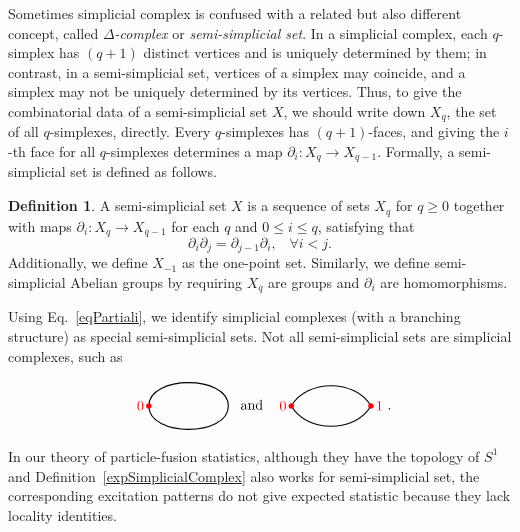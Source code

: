 \documentclass[reprint, amsmath, amssymb, showpacs, floatfix, longbibliography, aps, twocolumn, superscriptaddress, nofootinbib]{revtex4-2}
\theoremstyle{definition}
\newtheorem{definition}{Definition}[section]
\begin{document}
Sometimes simplicial complex is confused with a related but also different concept, called \emph{$\Delta$-complex} or \textit{semi-simplicial set}. In a simplicial complex, each $q$-simplex has $(q+1)$ distinct vertices and is uniquely determined by them; in contrast, in a semi-simplicial set, vertices of a simplex may coincide, and a simplex may not be uniquely determined by its vertices. Thus, to give the combinatorial data of a semi-simplicial set $X$, we should write down $X_q$, the set of all $q$-simplexes, directly. Every $q$-simplexes has $(q+1)$-faces, and giving the $i$-th face for all $q$-simplexes determines a map $\partial_i:X_q\rightarrow X_{q-1}$. Formally, a semi-simplicial set is defined as follows.
\begin{definition}\label{defSemiSimplicial}
	A semi-simplicial set $X$ is a sequence of sets $X_q$ for $q\ge 0$ together with maps $\partial_i: X_q\rightarrow X_{q-1}$ for each $q$ and $0\le i\le q$, satisfying that
	\begin{equation}
		\partial_i\partial_j=\partial_{j-1}\partial_i,\;\;\;\forall i<j.
	\end{equation}
	Additionally, we define $X_{-1}$ as the one-point set. Similarly, we define  semi-simplicial Abelian groups by requiring $X_q$ are groups and $\partial_i$ are homomorphisms.
\end{definition}

Using Eq.~\ref{eqPartiali}, we identify simplicial complexes (with a branching structure) as special semi-simplicial sets. Not all semi-simplicial sets are simplicial complexes, such as
\begin{equation}
	\vcenter{\hbox{\raisebox{-2.5ex}{
				\begin{tikzpicture}
					\coordinate (A) at (0,0);  
					\coordinate (C) at (2,0);   
					\draw[thick] (A) to[out=90, in=90] (C);   
					\draw[thick] (A) to[out=-90, in=-90] (C); 
					\fill[red] (A) circle (2pt) node[left] {0};
	\end{tikzpicture}}}} \;\;\; \text{and}
	\;\;\;
	\vcenter{\hbox{\raisebox{-2ex}{\begin{tikzpicture}
					\coordinate (A) at (0,0);  
					\coordinate (C) at (2,0);   
					\draw[thick] (A) to[out=60, in=120] (C);   
					\draw[thick] (A) to[out=-60, in=-120] (C); 
					\fill[red] (A) circle (2pt) node[left] {0};
					\fill[red] (C) circle (2pt) node[right] {1};
	\end{tikzpicture}}}}.
\end{equation}
 In our theory of particle-fusion statistics, although they have the topology of $S^1$ and Definition~\ref{expSimplicialComplex} also works for semi-simplicial set, the corresponding excitation patterns do not give expected statistic because they lack locality identities. 
\end{document}
